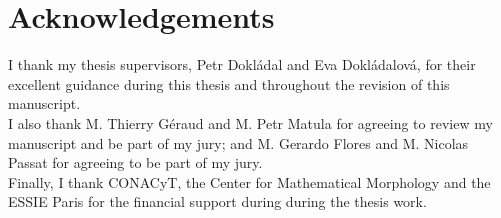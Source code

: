 \chapter*{Acknowledgements}

I thank my thesis supervisors, Petr Dokládal and Eva Dokládalová, for their excellent guidance during this thesis and throughout the revision of this manuscript. \\

\noindent I also thank M. Thierry Géraud and M. Petr Matula for agreeing to review my manuscript and be part of my jury; and M. Gerardo Flores and M. Nicolas Passat for agreeing to be part of my jury. \\

\noindent Finally, I thank CONACyT, the Center for Mathematical Morphology and the ESSIE Paris for the financial support during during the thesis work.


